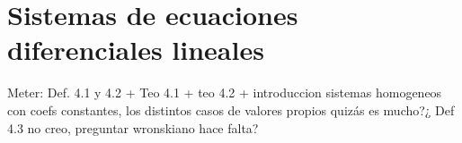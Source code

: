 \chapter{Sistemas de ecuaciones diferenciales lineales}

Meter: Def. 4.1 y 4.2 + Teo 4.1 + teo 4.2 + introduccion sistemas homogeneos con coefs constantes, los distintos casos de valores propios quizás es mucho?¿
Def 4.3 no creo, preguntar
wronskiano hace falta?

\endinput
-